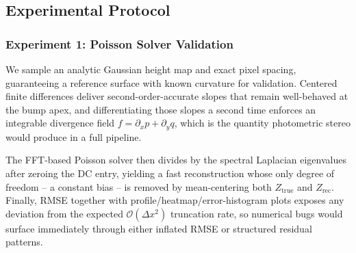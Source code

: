 \documentclass[11pt]{article}
\begin{document}
\subsection{Experimental Protocol}


\subsubsection{Experiment 1: Poisson Solver Validation}

\begin{center}
\end{center}

We sample an analytic Gaussian height
map and exact pixel spacing, guaranteeing a reference surface with known curvature
for validation. Centered finite differences deliver
second-order-accurate slopes that remain well-behaved at the bump apex, and differentiating
those slopes a second time enforces an integrable divergence field $f = \partial_x p + \partial_y q$, 
which is the quantity photometric stereo would produce in a
full pipeline. 

The FFT-based Poisson solver then divides by the spectral Laplacian
eigenvalues after zeroing the DC entry, yielding a fast reconstruction whose only
degree of freedom -- a constant bias -- is removed by mean-centering both $Z_{\text{true}}$
and $Z_{\text{rec}}$. Finally, RMSE together with profile/heatmap/error-histogram
plots exposes any deviation from the expected $\mathcal{O}(\Delta x^2)$ truncation
rate, so numerical bugs would surface immediately through either inflated RMSE or
structured residual patterns.
\end{document}
